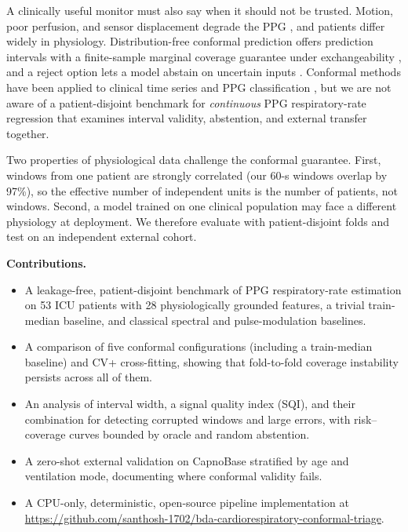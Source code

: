 \documentclass[conference]{IEEEtran}
\begin{document}
A clinically useful monitor must also say when it should not be trusted. Motion, poor perfusion, and sensor displacement degrade the PPG \cite{zheng2024tinyppg,zhao2026sqi}, and patients differ widely in physiology. Distribution-free conformal prediction offers prediction intervals with a finite-sample marginal coverage guarantee under exchangeability \cite{vovk2005,lei2018distfree,angelopoulos2021gentle}, and a reject option lets a model abstain on uncertain inputs \cite{hendrickx2024reject}. Conformal methods have been applied to clinical time series and PPG classification \cite{dalal2025sepsis,kinalioglu2026conformal}, but we are not aware of a patient-disjoint benchmark for \emph{continuous} PPG respiratory-rate regression that examines interval validity, abstention, and external transfer together.

Two properties of physiological data challenge the conformal guarantee. First, windows from one patient are strongly correlated (our 60-s windows overlap by 97\%), so the effective number of independent units is the number of patients, not windows. Second, a model trained on one clinical population may face a different physiology at deployment. We therefore evaluate with patient-disjoint folds and test on an independent external cohort.

\textbf{Contributions.}
\begin{itemize}
\item A leakage-free, patient-disjoint benchmark of PPG respiratory-rate estimation on 53 ICU patients with 28 physiologically grounded features, a trivial train-median baseline, and classical spectral and pulse-modulation baselines.
\item A comparison of five conformal configurations (including a train-median baseline) and CV+ cross-fitting, showing that fold-to-fold coverage instability persists across all of them.
\item An analysis of interval width, a signal quality index (SQI), and their combination for detecting corrupted windows and large errors, with risk--coverage curves bounded by oracle and random abstention.
\item A zero-shot external validation on CapnoBase stratified by age and ventilation mode, documenting where conformal validity fails.
\item A CPU-only, deterministic, open-source pipeline implementation at \url{https://github.com/santhosh-1702/bda-cardiorespiratory-conformal-triage}.
\end{itemize}
\end{document}
